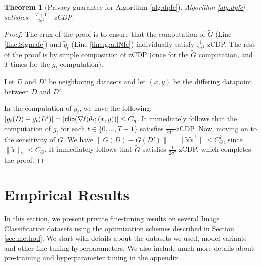 \documentclass[letterpaper]{article} \usepackage{fullpage}
\newtheorem{thm}[lem]{Theorem}
\begin{document}
\begin{thm}[Privacy guarantee for Algorithm \ref{alg:dpfc}]
Algorithm \ref{alg:dpfc} satisfies $\frac{(T+1)}{2\sigma^2}$-zCDP.
\end{thm}

\begin{proof}
The crux of the proof is to ensure that the computation of $\tilde G$ (Line \ref{line:Sigmafc}) and $\tilde g_t$ (Line \ref{line:gradNfc}) individually satisfy $\frac{1}{2\sigma^2}$-zCDP. The rest of the proof is by simple composition of zCDP \cite{bun2016concentrated} (once for the $\tilde G$ computation, and $T$ times for the $\tilde g_t$ computation).

Let $D$ and $D'$ be neighboring datasets and let $(x,y)$ be the differing datapoint between $D$ and $D'$. 

In the computation of $g_t$, we have the following: $|g_{t}(D) - g_{t}(D')| = |{\sf clip}(\nabla \ell(\theta_{t};(x, y))| \leq C_g$. It immediately follows that the computation of $\tilde g_t$ for each $t\in\{0,\ldots,T-1\}$ satisfies $\frac{1}{2\sigma^2}$-zCDP. Now, moving on to the sensitivity of $G$. We have $\|G(D) - G(D')\|= \|\tilde x \tilde x^\top\| \leq C_G^2$, since $\|\tilde x\|_2\leq C_G$. It immediately follows that $\tilde G$ satisfies $\frac{1}{2\sigma^2}$-zCDP, which completes the proof.
\end{proof}


\section{Empirical Results}
In this section, we present private fine-tuning results on several Image Classification datasets using the optimization schemes described in Section \ref{sec:method}.  We start with details about the datasets we used, model variants and other fine-tuning hyperparameters. We also include much more details about pre-training and hyperparameter tuning in the appendix.
\end{document}
